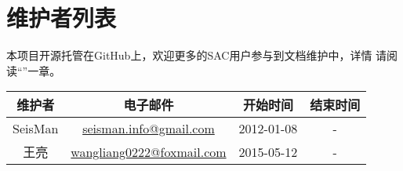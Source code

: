 {\section*{维护者列表}}

本项目开源托管在GitHub上，欢迎更多的SAC用户参与到文档维护中，详情
请阅读``''一章。
\begin{table}[H]
\centering
\begin{tabular}{cccc}
\toprule
维护者      & 电子邮件                               &   开始时间    &   结束时间    \\
\midrule
SeisMan     & \url{seisman.info@gmail.com}   &  2012-01-08   &   -           \\
王亮     & \url{wangliang0222@foxmail.com}   &  2015-05-12   &   -           \\
\bottomrule
\end{tabular}
\end{table}
